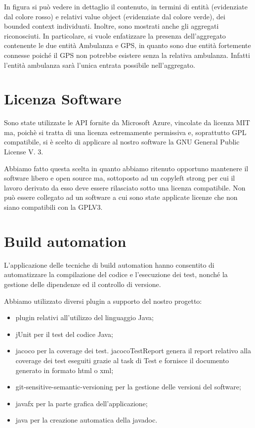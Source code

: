 \documentclass[12pt]{article}
\begin{document}
In figura si può vedere in dettaglio il contenuto, in termini di entità (evidenziate dal colore rosso) e relativi value object (evidenziate dal colore verde), dei bounded context individuati.
Inoltre, sono mostrati anche gli aggregati riconosciuti. In particolare, si vuole enfatizzare la presenza dell'aggregato contenente le due entità Ambulanza e GPS, in quanto sono due entità fortemente connesse poiché il GPS non potrebbe esistere senza la relativa ambulanza. Infatti l'entità ambulanza sarà l'unica entrata possibile nell'aggregato.

\section{Licenza Software}

Sono state utilizzate le API fornite da Microsoft Azure, vincolate da licenza MIT ma, poichè si tratta di una licenza estremamente permissiva e, soprattutto GPL compatibile, si è scelto di applicare al nostro software la GNU General Public License V. 3.

Abbiamo fatto questa scelta in quanto abbiamo ritenuto opportuno mantenere il software libero e open source ma, sottoposto ad un copyleft strong per cui il lavoro derivato da esso deve essere rilasciato sotto una licenza compatibile. Non può essere collegato ad un software a cui sono state applicate licenze che non siano compatibili con la GPLV3.

\section{Build automation}
L'applicazione delle tecniche di build automation hanno consentito di automatizzare la compilazione del codice e l'esecuzione dei test, nonché la gestione delle dipendenze ed il controllo di versione.

Abbiamo utilizzato diversi plugin a supporto del nostro progetto:
\begin{itemize}
    \item plugin relativi all'utilizzo del linguaggio Java;
    \item jUnit per il test del codice Java;
    \item jacoco per la coverage dei test. jacocoTestReport genera il report relativo alla coverage dei test eseguiti grazie al task di Test e fornisce il documento generato in formato html o xml;
    \item git-sensitive-semantic-versioning per la gestione delle versioni del software;
    \item javafx per la parte grafica dell'applicazione;
    \item java per la creazione automatica della javadoc.
\end{itemize}
\end{document}
